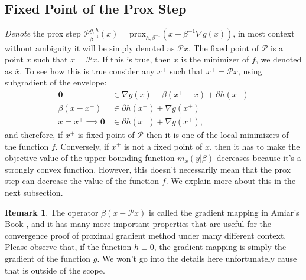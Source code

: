 \documentclass[]{article}
\theoremstyle{definition}
\newtheorem{remark}{Remark}[subsection]
{
    \newtheorem{assumption}{Assumption}
}
\begin{document}
    \subsection{Fixed Point of the Prox Step}\label{sec:fixed_point_prox}
        \emph{Denote} the prox step $\mathcal P_{\beta^{-1}}^{g, h}(x) = \text{prox}_{h, \beta^{-1}}(x - \beta^{-1}\nabla g(x))$, in most context without ambiguity it will be simply denoted as $\mathcal Px$. The fixed point of $\mathcal P$ is a point $x$ such that $x = \mathcal P x$. If this is true, then $x$ is the minimizer of $f$, we denoted as $\bar x$. To see how this is true consider any $x^+$ such that $x^+ = \mathcal Px$, using subgradient of the envelope: 
        \begin{align*}
            \mathbf 0 
            &\in \nabla g(x) + \beta(x^+ - x) + \partial h(x^+)
            \\
            \beta(x - x^+) &\in \partial h(x^+) + \nabla g(x^+)
            \\
            x = x^+ \implies \mathbf 0 &\in 
            \partial h(x^+) + \nabla g(x^+), 
        \end{align*}
        and therefore, if $x^+$ is fixed point of $\mathcal P$ then it is one of the local minimizers of the function $f$. Conversely, if $x^+$ is not a fixed point of $x$, then it has to make the objective value of the upper bounding function $m_x(y| \beta)$ decreases because it's a strongly convex function. However, this doesn't necessarily mean that the prox step can decrease the value of the function $f$. We explain more about this in the next subsection. 
        \begin{remark}
            The operator $\beta(x - \mathcal Px)$ is called the gradient mapping in Amiar's Book \cite{book:first_order_opt}, and it has many more important properties that are useful for the convergence proof of proximal gradient method under many different context. Please observe that, if the function $h \equiv 0$, the gradient mapping is simply the gradient of the function $g$. We won't go into the details here unfortunately cause that is outside of the scope. 
        \end{remark}
\end{document}

